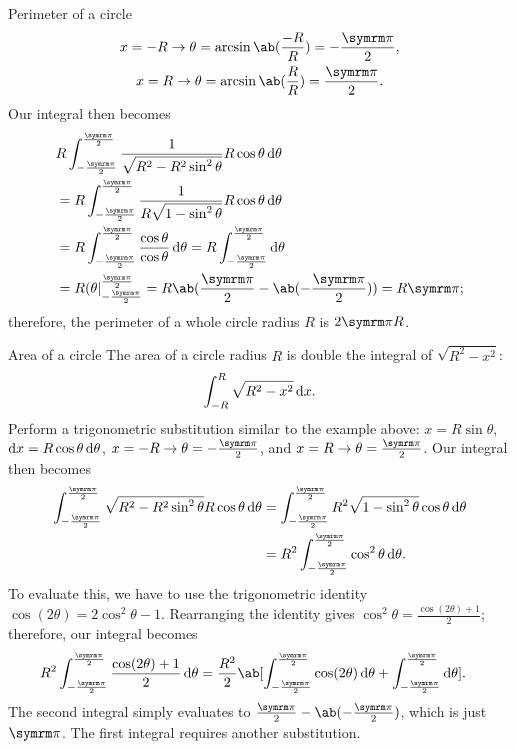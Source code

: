 \begin{exmp}{Perimeter of a circle}{}
  \begin{equation}
    \begin{gathered}
      x = -R \appr \theta = \arcsin\ab(\frac{-R}{R}) = -\frac{\cpi}{2}, \\
      x = R \appr \theta = \arcsin\ab(\frac{R}{R}) = \frac{\cpi}{2}.
    \end{gathered}
  \end{equation}
  Our integral then becomes
  \begin{align}
     & R\int_{-\frac{\cpi}{2}}^{\frac{\cpi}{2}}\frac{1}{\sqrt{R^2 - R^2\sin^2\theta}}R\cos\theta\odif{\theta} \nonumber                             \\
     & = R\int_{-\frac{\cpi}{2}}^{\frac{\cpi}{2}}\frac{1}{R\sqrt{1 - \sin^2\theta}}R\cos\theta\odif{\theta}                                         \\
     & = R\int_{-\frac{\cpi}{2}}^{\frac{\cpi}{2}}\frac{\cos\theta}{\cos\theta}\odif{\theta} = R\int_{-\frac{\cpi}{2}}^{\frac{\cpi}{2}}\odif{\theta} \\
     & = R(\theta|_{-\frac{\cpi}{2}}^{\frac{\cpi}{2}} = R\ab(\frac{\cpi}{2} - \ab(-\frac{\cpi}{2})) = R\cpi;
  \end{align}
  therefore, the perimeter of a whole circle radius \(R\) is \(2\cpi R\).
\end{exmp}
\begin{exmp}{Area of a circle}{}
  The area of a circle radius \(R\) is double the integral of \(\sqrt{R^2 - x^2}\):
  \begin{equation}
    \int_{-R}^{R}\sqrt{R^2 - x^2}\odif{x}.
  \end{equation}
  Perform a trigonometric substitution similar to the example above: \(x = R\sin\theta\), \(\odif{x} = R\cos\theta\odif{\theta}\), \(x = -R \appr \theta = -\frac{\cpi}{2}\), and \(x = R \appr \theta = \frac{\cpi}{2}\). Our integral then becomes
  \begin{align}
    \int_{-\frac{\cpi}{2}}^{\frac{\cpi}{2}}\sqrt{R^2 - R^2\sin^2\theta}R\cos\theta\odif{\theta}
     & = \int_{-\frac{\cpi}{2}}^{\frac{\cpi}{2}}R^2\sqrt{1 - \sin^2\theta}\cos\theta\odif{\theta} \nonumber \\
     & = R^2\int_{-\frac{\cpi}{2}}^{\frac{\cpi}{2}}\cos^2\theta\odif{\theta}.
  \end{align}
  To evaluate this, we have to use the trigonometric identity \(\cos(2\theta) = 2\cos^2\theta - 1\). Rearranging the identity gives \(\cos^2\theta = \frac{\cos(2\theta) + 1}{2}\); therefore, our integral becomes
  \begin{align}
    R^2\int_{-\frac{\cpi}{2}}^{\frac{\cpi}{2}}\frac{\cos(2\theta) + 1}{2}\odif{\theta}
     & = \frac{R^2}{2}\ab[\int_{-\frac{\cpi}{2}}^{\frac{\cpi}{2}}\cos(2\theta)\odif{\theta} + \int_{-\frac{\cpi}{2}}^{\frac{\cpi}{2}}\odif{\theta}].
  \end{align}
  The second integral simply evaluates to \(\frac{\cpi}{2} - \ab(-\frac{\cpi}{2})\), which is just \(\cpi\). The first integral requires another substitution.
\end{exmp}

